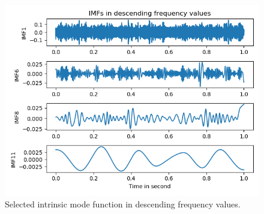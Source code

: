 \documentclass[../Main/thesis.tex]{subfiles}
\begin{document}
\begin{figure}[H]
	\centering
	\includegraphics[width=0.9\linewidth]{../fig/imf_freq_band}
	\caption{Selected intrinsic mode function in descending frequency values.}
	\label{fig:imfsfreqband}
\end{figure}

\end{document}
